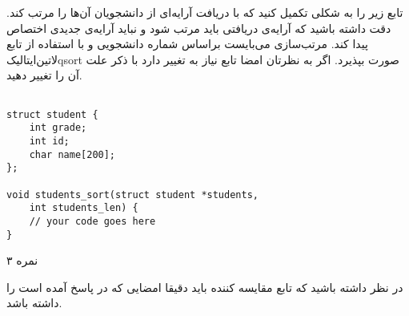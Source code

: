 
تابع زیر را به شکلی تکمیل کنید که با دریافت آرایه‌ای از دانشجویان آن‌ها را مرتب کند.
دقت داشته باشید که آرایه‌ی دریافتی باید مرتب شود و نباید آرایه‌ی جدیدی اختصاص پیدا کند.
مرتب‌سازی می‌بایست براساس شماره دانشجویی و با استفاده از تابع
‌لاتین{‌ایتالیک{qsort}}
صورت بپذیرد.
اگر به نظرتان امضا تابع نیاز به تغییر دارد با ذکر علت آن را تغییر دهید.

\begin{latin}
\begin{verbatim}

struct student {
    int grade;
    int id;
    char name[200];
};

void students_sort(struct student *students,
    int students_len) {
    // your code goes here
}
\end{verbatim}
\end{latin}

۳ نمره



در نظر داشته باشید که تابع مقایسه کننده باید دقیقا امضایی که در پاسخ آمده است را داشته باشد.

\begin{latin}
  \inputminted{c}{./sorted-students/main.c}
\end{latin}

